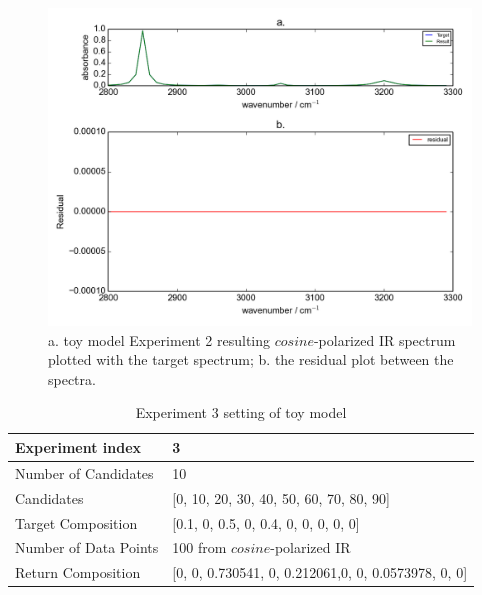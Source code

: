 \begin{figure}[!ht] 
\includegraphics[scale=0.7]{Figures/toy_model_result_plotting_ir_cos_4candi_1.png}
\caption{a. toy model Experiment 2 resulting $cosine$-polarized IR spectrum plotted with the target spectrum; b. the residual plot between the spectra.}
\label{fig:3.2}
\end{figure}

\begin{table} 
\begin{tabular}{| l | p{7cm} | }
\hline
Experiment index & 3  \\
\hline
Number of Candidates & 10   \\
\hline
Candidates & [0, 10, 20, 30, 40, 50, 60, 70, 80, 90]  \\
\hline
Target Composition & [0.1, 0, 0.5, 0, 0.4, 0, 0, 0, 0, 0] \\
\hline
Number of Data Points & 100 from $cosine$-polarized IR \\
\hline
Return Composition & [0, 0, 0.730541, 0, 0.212061,0, 0, 0.0573978, 0, 0] \\
\hline
\end{tabular}
\caption{Experiment 3 setting of toy model}
\label{tab:3.2}
\end{table}	

